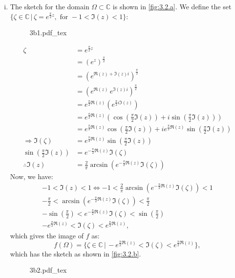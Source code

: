 \documentclass[a4paper, titlepage, DIV=14]{scrartcl}
\newcommand{\incfig}[1]{%
    \def\svgwidth{0.8\columnwidth}
    {#1.pdf_tex}
}
\begin{document}
\begin{enumerate}
\begin{enumerate}[i)]
            \item
            The sketch for the domain $\Omega \subset \mathbb{C}$ is shown in \autoref{fig:3.2.a}. 
            We define the set $\{\zeta \in \mathbb{C} \, | \, \zeta = e^{\frac{\pi}{2}z}, \text{ for } -1<\Im(z)<1\}$:
            \begin{figure}[!h]
                \centering
                \incfig{3b1}
                \caption{}
                \label{fig:3.2.a}
            \end{figure}
            \begin{align*}
                \zeta &= e^{\frac{\pi}{2}z} \\
                    &= (e^{z})^{\frac{\pi}{2}} \\
                    &= (e^{\Re(z)+\Im(z)i})^{\frac{\pi}{2}} \\
                    &= (e^{\Re(z)} \, e^{\Im(z)i})^{\frac{\pi}{2}} \\
                    &= e^{\frac{\pi}{2}\Re(z)}(e^{\frac{\pi}{2}i\Im(z)}) \\
                    &= e^{\frac{\pi}{2}\Re(z)}(\cos(\frac{\pi}{2}\Im(z))
                        + i\sin(\frac{\pi}{2}\Im(z))) \\
                    &= e^{\frac{\pi}{2}\Re(z)}\cos(\frac{\pi}{2}\Im(z))
                        + ie^{\frac{\pi}{2}\Re(z)}\sin(\frac{\pi}{2}\Im(z)) \\
                \Rightarrow \Im(\zeta) &= e^{\frac{\pi}{2}\Re(z)}\sin(\frac{\pi}{2}\Im(z)) \\
                \sin(\frac{\pi}{2}\Im(z)) &= e^{-\frac{\pi}{2}\Re(z)}\Im(\zeta) \\
                \therefore \Im(z) &= \frac{2}{\pi} \arcsin(e^{-\frac{\pi}{2}\Re(z)}\Im(\zeta))
            \end{align*}
            Now, we have:
            \begin{gather*}
                -1 < \Im(z) < 1 \Leftrightarrow -1 < \frac{2}{\pi} 
                    \arcsin(e^{-\frac{\pi}{2}\Re(z)}\Im(\zeta)) < 1 \\
                -\frac{\pi}{2} < \arcsin(e^{-\frac{\pi}{2}\Re(z)}\Im(\zeta)) < \frac{\pi}{2} \\
                -\sin(\frac{\pi}{2}) < e^{-\frac{\pi}{2}\Re(z)}\Im(\zeta) < \sin(\frac{\pi}{2}) \\
                -e^{\frac{\pi}{2}\Re(z)} < \Im(\zeta) < e^{\frac{\pi}{2}\Re(z)},
            \end{gather*} which gives the image of $f$ as:
            \begin{equation*}
                f(\Omega) = \{\zeta \in \mathbb{C} \, | \, -e^{\frac{\pi}{2}\Re(z)} < \Im(\zeta) < e^{\frac{\pi}{2}\Re(z)}\},
            \end{equation*} which has the sketch as shown in \autoref{fig:3.2.b}.
            \begin{figure}[!h]
                \centering
                {3b2.pdf_tex}
                \caption{}
                \label{fig:3.2.b}
            \end{figure}
            

\end{enumerate}
\end{enumerate}
\end{document}
